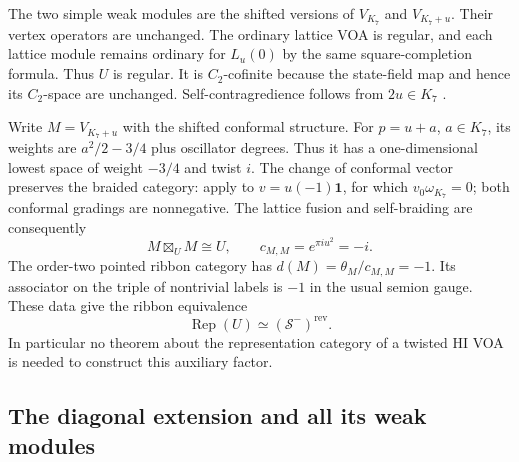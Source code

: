 \documentclass[11pt,a4paper]{article}
\numberwithin{equation}{section}
\theoremstyle{definition}\newtheorem{definition}[theorem]{Definition}
\theoremstyle{remark}\newtheorem{remark}[theorem]{Remark}
\begin{document}
The two simple weak modules are the shifted versions of $V_{K_7}$
and $V_{K_7+u}$. Their vertex operators are unchanged.
The ordinary lattice VOA is regular, and each lattice module remains
ordinary for $L_u(0)$ by the same square-completion formula.
Thus $U$ is regular. It is $C_2$-cofinite because the state-field
map and hence its $C_2$-space are unchanged. Self-contragredience
follows from $2u\in K_7$
\cite[Theorems 3.1, 4.1, 4.4]{dongmason}.

Write $M=V_{K_7+u}$ with the shifted conformal structure.
For $p=u+a$, $a\in K_7$, its weights are
$a^2/2-3/4$ plus oscillator degrees. Thus it has a one-dimensional
lowest space of weight $-3/4$ and twist $i$.
The change of conformal vector preserves the braided category:
apply \cite[Proposition 2.17]{mcrae} to
$v=u(-1)\mathbf1$, for which $v_0\omega_{K_7}=0$;
both conformal gradings are nonnegative.
The lattice fusion and self-braiding are consequently
\[
 M\boxtimes_U M\cong U,
 \qquad c_{M,M}=e^{\pi i u^2}=-i.
\]
The order-two pointed ribbon category has
$d(M)=\theta_M/c_{M,M}=-1$.
Its associator on the triple of nontrivial labels is $-1$ in the
usual semion gauge. These data give the ribbon equivalence
\begin{equation}\label{audit:inverseE7}
            \operatorname{Rep}(U)\simeq(\mathcal S^-)^{\mathrm{rev}}.
\end{equation}
In particular no theorem about the representation category of a
twisted HI VOA is needed to construct this auxiliary factor.

\subsection{The diagonal extension and all its weak modules}
\end{document}
